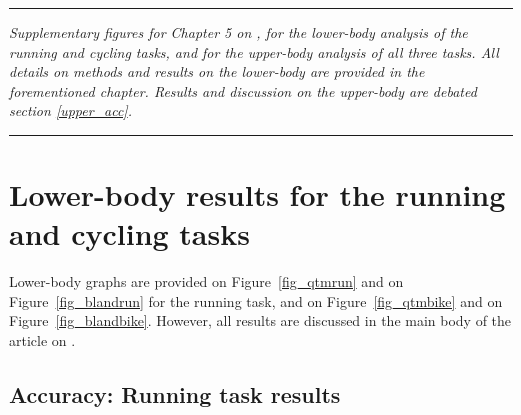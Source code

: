 
\begin{center}
\rule{0.7\linewidth}{.5pt}
\begin{minipage}{0.7\linewidth}
\smallskip

\textit{
Supplementary figures for Chapter 5 on , for the lower-body analysis of the running and cycling tasks, and for the upper-body analysis of all three tasks. \newline\newline All details on methods and results on the lower-body are provided in the forementioned chapter. Results and discussion on the upper-body are debated section \ref{upper_acc}.
}

\end{minipage}
\smallskip
\rule{0.7\linewidth}{.5pt}
\end{center}

\minitoc
\newpage

\section{Lower-body results for the running and cycling tasks}

Lower-body graphs are provided on Figure~\ref{fig_qtmrun} and on Figure~\ref{fig_blandrun} for the running task, and on Figure~\ref{fig_qtmbike} and on Figure~\ref{fig_blandbike}. However, all results are discussed in the main body of the article on .

\subsection{Accuracy: Running task results}

